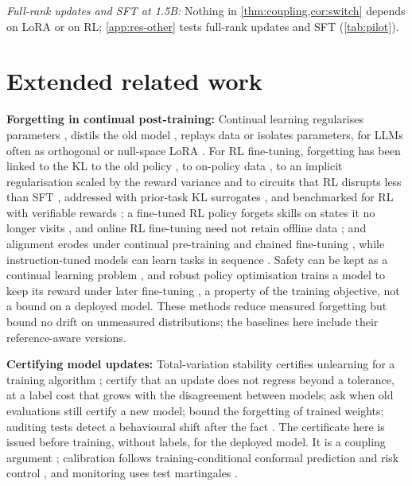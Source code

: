 \documentclass{article}
\theoremstyle{plain}
\theoremstyle{definition}
\theoremstyle{remark}
\begin{document}
\emph{Full-rank updates and SFT at 1.5B:} Nothing in \cref{thm:coupling,cor:switch} depends on LoRA or on RL;
\cref{app:res-other} tests full-rank updates and SFT (\cref{tab:pilot}).


\section{Extended related work}
\label{app:related}

\textbf{Forgetting in continual post-training:} Continual learning regularises parameters \citep{kirkpatrick2017ewc},
distils the old model \citep{li2018lwf}, replays data \citep{rolnick2019replay} or isolates parameters, for LLMs often
as orthogonal or null-space LoRA \citep{wang2023olora,liang2024inflora,liang2025gainlora}. For RL fine-tuning,
forgetting has been linked to the KL to the old policy \citep{shenfeld2026razor}, to on-policy data
\citep{chen2025retaining}, to an implicit regularisation scaled by the reward variance \citep{lai2025reinforcement} and
to circuits that RL disrupts less than SFT \citep{rojasnunez2026mechanistic}, addressed with prior-task KL surrogates \citep{luo2026cpo}, and benchmarked for RL with verifiable rewards
\citep{luo2026beyond}; a fine-tuned RL policy forgets skills on states it no longer visits \citep{wolczyk2024finetuning}, and online RL
fine-tuning need not retain offline data \citep{zhou2025efficient};
and alignment erodes under continual pre-training and chained fine-tuning \citep{li2024examining,ung2024chained},
while instruction-tuned models can learn tasks in sequence \citep{scialom2022fine}. Safety can be kept as a continual
learning problem \citep{alssum2025unforgotten}, and robust policy optimisation trains a model to keep its reward under
later fine-tuning \citep{sabbaghi2026robust}, a property of the training objective, not a bound on a deployed model. These
methods reduce measured forgetting but bound no drift on unmeasured distributions; the baselines here include their
reference-aware versions.

\textbf{Certifying model updates:} Total-variation stability certifies unlearning for a training algorithm
\citep{ullah2021unlearning}; \citet{balachandran2026pay} certify that an update does not regress beyond a tolerance, at a
label cost that grows with the disagreement between models; \citet{mondal2026when} ask when old evaluations still
certify a new model; \citet{friedman2026bounds} bound the forgetting of trained weights; auditing tests detect a behavioural shift after
the fact \citep{richter2025auditing}. The certificate here is issued
before training, without labels, for the deployed model. It is a coupling argument \citep{lindvall1992coupling};
calibration follows training-conditional conformal prediction and risk control \citep{vovk2012conditional,bates2021rcps},
and monitoring uses test martingales \citep{ramdas2023gametheoretic,ville1939}.
\end{document}
